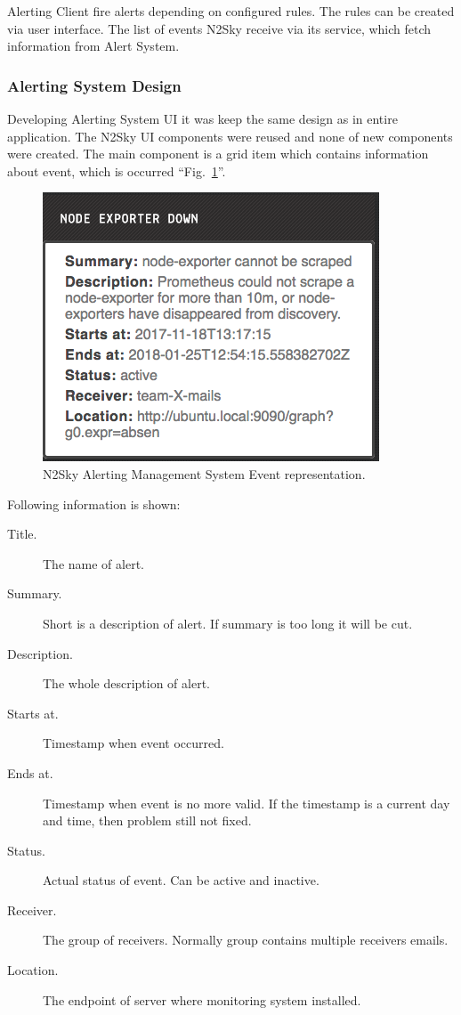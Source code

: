 Alerting Client fire alerts depending on configured rules. The rules can be created via user interface. The list of events N2Sky receive via its service, which fetch information from Alert System. 
 
\subsubsection{Alerting System Design}\label{Alerting System Design}

Developing Alerting System UI it was keep the same design as in entire application. The N2Sky UI components were reused and none of new components were created. The main component is a grid item which contains information about event, which is occurred  ``Fig.~\ref{fig:alert_grid}''.

\begin{figure}[htbp]
\begin{center}
  \includegraphics[scale=0.7]{components/3/alerts/alert_grid.png}
  \caption{N2Sky Alerting Management System Event representation.}
  \label{fig:alert_grid}
\end{center}
\end{figure}

Following information is shown:

\begin{description}
\item[Title.] The name of alert.
\item[Summary.]   Short is a description of alert. If summary is too long it will be cut.
\item[Description.] The whole description of alert.
\item[Starts at.] Timestamp when event occurred. 
\item[Ends at.] Timestamp when event is no more valid. If the timestamp is a current day and time, then problem still not fixed. 
\item[Status.] Actual status of event. Can be active and inactive.
\item[Receiver.] The group of receivers. Normally group contains multiple receivers emails. 
\item[Location.] The endpoint of server where monitoring system installed. 
\end{description}

